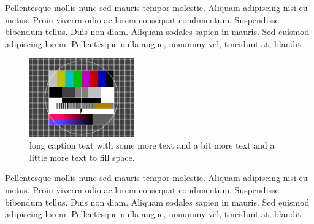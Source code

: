 %
\begin{filecontents*}{\democodefile}
Pellentesque mollis nunc sed mauris tempor molestie. Aliquam adipiscing nisi
eu metus. Proin viverra odio ac lorem consequat condimentum. Suspendisse
bibendum tellus. Duis non diam. Aliquam sodales sapien in mauris. Sed euismod
adipiscing lorem. Pellentesque nulla augue, nonummy vel, tincidunt at, blandit 

\begin{figure}[H]
\begin{margincap}
  \centering
  \includegraphics[width=0.4\textwidth]{images/testimage}
  \caption[short caption text]{long caption text with some more 
   text and a bit more text and a little more text to fill space.}
  \label{fig:picmargincap}
\end{margincap}
\end{figure}

Pellentesque mollis nunc sed mauris tempor molestie. Aliquam adipiscing nisi
eu metus. Proin viverra odio ac lorem consequat condimentum. Suspendisse
bibendum tellus. Duis non diam. Aliquam sodales sapien in mauris. Sed euismod
adipiscing lorem. Pellentesque nulla augue, nonummy vel, tincidunt at, blandit 
\end{filecontents*}

%

